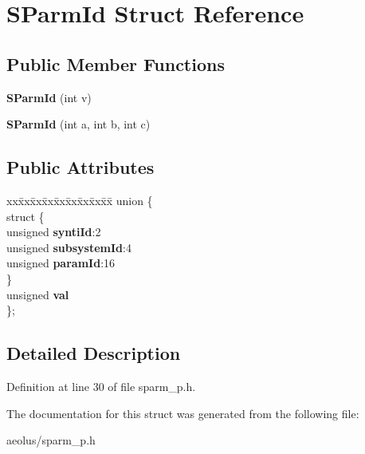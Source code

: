 \hypertarget{struct_s_parm_id}{}\section{S\+Parm\+Id Struct Reference}
\label{struct_s_parm_id}
\subsection*{Public Member Functions}
\begin{DoxyCompactItemize}
\item 
\mbox{\label{struct_s_parm_id_ad9c995faebdfdfe817501b49b27860d7}} 
{\bfseries S\+Parm\+Id} (int v)
\item 
\mbox{\label{struct_s_parm_id_a3dc3ee040464684427681c79bae83aa6}} 
{\bfseries S\+Parm\+Id} (int a, int b, int c)
\end{DoxyCompactItemize}
\subsection*{Public Attributes}
\begin{DoxyCompactItemize}
\item 
\mbox{\label{struct_s_parm_id_a89e4e5f93a3ad4119dff12ef192062c8}} 
\begin{tabbing}
xx\=xx\=xx\=xx\=xx\=xx\=xx\=xx\=xx\=\kill
union \{\\
\mbox{\label{union_s_parm_id_1_1_0D19_af35fa278560b9ddad92e6ca3b2b9ad67}} 
\>struct \{\\
\>\>unsigned {\bfseries syntiId}:2\\
\>\>unsigned {\bfseries subsystemId}:4\\
\>\>unsigned {\bfseries paramId}:16\\
\>\} \\
\>unsigned {\bfseries val}\\
\}; \\

\end{tabbing}\end{DoxyCompactItemize}


\subsection{Detailed Description}


Definition at line 30 of file sparm\+\_\+p.\+h.



The documentation for this struct was generated from the following file\+:\begin{DoxyCompactItemize}
\item 
aeolus/sparm\+\_\+p.\+h\end{DoxyCompactItemize}
